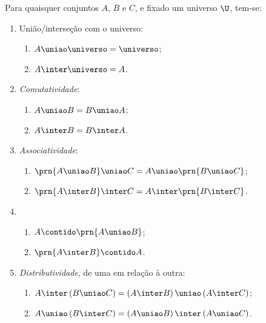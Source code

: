 \begin{proposition}
    \label{prop:uniao-e-intersecao}
    Para quaisquer conjuntos $A$, $B$ e $C$, e fixado um universo $\U$, tem-se:
    \begin{enumerate}
        \item
            União/interseção com o universo:
            \begin{enumerate}
                \item $A \uniao \universo = \universo$;
                \item $A \inter \universo = A$.
            \end{enumerate}
        \item
            \emph{Comutatividade}:
            \begin{enumerate}
                \item $A \uniao B = B \uniao A$;
                \item $A \inter B = B \inter A$.
            \end{enumerate}

        \item
            \emph{Associatividade}:
            \begin{enumerate}
                \item $\prn{A \uniao B} \uniao C = A \uniao \prn{ B \uniao C}$;
                \item $\prn{A \inter B} \inter C = A \inter \prn{ B \inter C}$.
            \end{enumerate}

        \item
            \begin{enumerate}
                \label{prop:uniao-e-intersecao-inclusao}
                \item
                    \label{prop:uniao-inclusao}
                    $A \contido \prn{A \uniao B}$;
                \item
                    \label{prop:intersecao-inclusao}
                    $\prn{A \inter B} \contido A$.
            \end{enumerate}

        \item
            \emph{Distributividade}, de uma em relação à outra:
            \begin{enumerate}
                \item $A \inter \left( B \uniao C \right) = \left(A \inter B \right) \uniao \left( A \inter C \right)$;
                \item $A \uniao \left( B \inter C \right) = \left(A \uniao B \right) \inter \left( A \uniao C  \right)$.
            \end{enumerate}


\end{enumerate}
\end{proposition}
